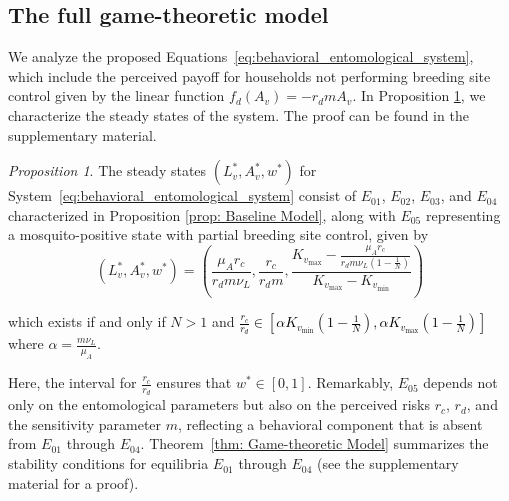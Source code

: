 \documentclass{article}
\theoremstyle{remark}
\theoremstyle{custom} %
\newtheorem{proposition}{Proposition}
\begin{document}
\subsection{The full game-theoretic model}
\label{full_GTM}
We analyze the proposed Equations~\eqref{eq:behavioral_entomological_system}, which include the perceived payoff for households not performing breeding site control given by the linear function $f_d(A_v) = - r_d m A_v$.
In Proposition \ref{prop: Game-theoretic Model}, we characterize the steady states of the system. The proof can be found in the supplementary material.



\begin{proposition}\label{prop: Game-theoretic Model}
The steady states $\left(L_v^*, A_v^*, w^*\right)$ for System~\eqref{eq:behavioral_entomological_system} consist of $E_{01}$, $E_{02}$, $E_{03}$, and $E_{04}$ characterized in Proposition \ref{prop: Baseline Model}, along with  $E_{05}$ representing a mosquito-positive state with partial breeding site control, given by
\begin{equation}
\left(L_v^*, A_v^*, w^*\right)=\left(\frac{\mu_A r_c}{r_dm\nu_L}, \frac{r_c}{r_dm}, \frac{K_{v_{\max }}-\frac{\mu_A r_c}{r_dm\nu_L\left(1-\frac{1}{N}\right)}}{K_{v_{\max }}-K_{v_{\min }}}\right)
\label{E05_formula}
\end{equation}


which exists if and only if $N>1$ and \textcolor{black}{$\frac{r_c}{r_d} \in\left[\alpha K_{v_{\min }}\left(1-\frac{1}{N}\right), \alpha K_{v_{\max }}\left(1-\frac{1}{N}\right)\right]$} where $\alpha=\frac{m \nu_L}{\mu_A}.$  

    
\end{proposition}


 Here, the interval for {\( \frac{r_c}{r_d}\)} ensures that \( w^* \in [0,1] \). Remarkably, \( E_{05} \) depends not only on the entomological parameters but also on the perceived risks \( r_c \), \( r_d \), and the sensitivity parameter \( m \), reflecting a behavioral component that is absent from \( E_{01} \) through \( E_{04} \). Theorem~\ref{thm: Game-theoretic Model} summarizes the stability conditions for equilibria \( E_{01} \) through \( E_{04} \) (see the supplementary material for a proof). 
\end{document}
